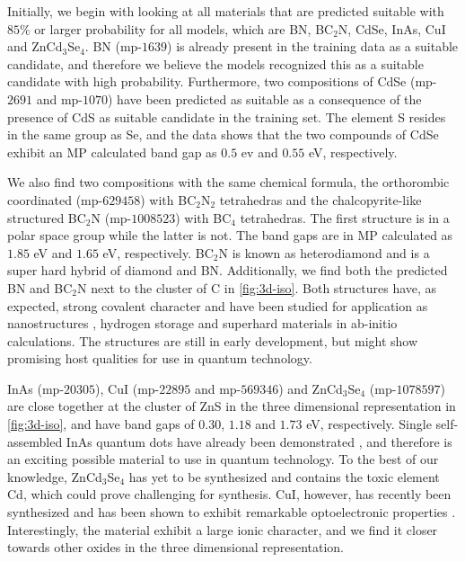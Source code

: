 





\noindent Initially, we begin with looking at all materials that are predicted suitable with $85\%$ or larger probability for all models, which are BN, BC$_2$N, CdSe, InAs, CuI and ZnCd$_3$Se$_4$. BN (mp-$1639$) is already present in the training data as a suitable candidate, and therefore we believe the models recognized this as a suitable candidate with high probability. Furthermore, two compositions of CdSe (mp-$2691$ and mp-$1070$) have been predicted as suitable as a consequence of the presence of CdS as suitable candidate in the training set. The element S resides in the same group as Se, and the data shows that the two compounds of CdSe exhibit an MP calculated band gap as $0.5$ ev and $0.55$ eV, respectively.

We also find two compositions with the same chemical formula, the orthorombic coordinated (mp-$629458$) with BC$_2$N$_2$ tetrahedras and the chalcopyrite-like structured BC$_2$N (mp-$1008523$) with BC$_4$ tetrahedras. The first structure is in a polar space group while the latter is not. The band gaps are in MP calculated as $1.85$ eV and $1.65$ eV, respectively. BC$_2$N is known as heterodiamond and is a super hard hybrid of diamond and BN. Additionally, we find both the predicted BN and BC$_2$N next to the cluster of C in \autoref{fig:3d-iso}. Both structures have, as expected, strong covalent character and have been studied for application as nanostructures \cite{Gao2017}, hydrogen storage \cite{Cai2017} and superhard materials \cite{Li2017, Jiang2020} in ab-initio calculations. The structures are still in early development, but might show promising host qualities for use in quantum technology.

InAs (mp-$20305$), CuI (mp-$22895$ and mp-$569346$) and ZnCd$_3$Se$_4$ (mp-$1078597$) are close together at the cluster of ZnS in the three dimensional representation in \autoref{fig:3d-iso}, and have band gaps of $0.30$, $1.18$ and $1.73$ eV, respectively. Single self-assembled InAs quantum dots have already been demonstrated \cite{Liu2018}, and therefore is an exciting possible material to use in quantum technology. To the best of our knowledge, ZnCd$_3$Se$_4$ has yet to be synthesized and contains the toxic element Cd, which could prove challenging for synthesis. CuI, however, has recently been synthesized and has been shown to exhibit remarkable optoelectronic properties \cite{Ahn2020}. Interestingly, the material exhibit a large ionic character, and we find it closer towards other oxides in the three dimensional representation.

